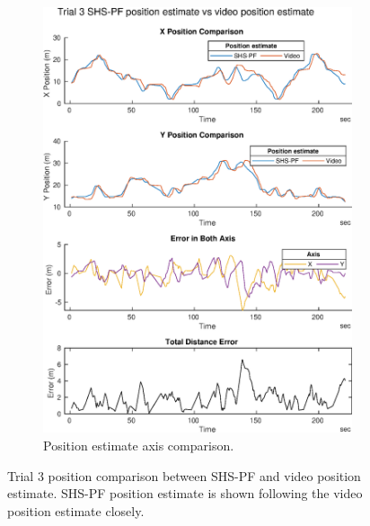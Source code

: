 \begin{figure}[H]
\begin{subfigure}[t]{.45\textwidth}
 		\includegraphics[width=\linewidth]{images/20201129_1900_trial_3_traj_1}
 		\caption{Position estimate axis comparison.}
 		\label{fig:shspf_trial3_comparison}
 	\end{subfigure}
 \setlength{\belowcaptionskip}{-20pt}
 	\caption{Trial 3 position comparison between SHS-PF and video position estimate. SHS-PF position estimate is shown following the video position estimate closely.}
 	\label{fig:shspf_trial3_shs_gt_comparison}
 \end{figure}
